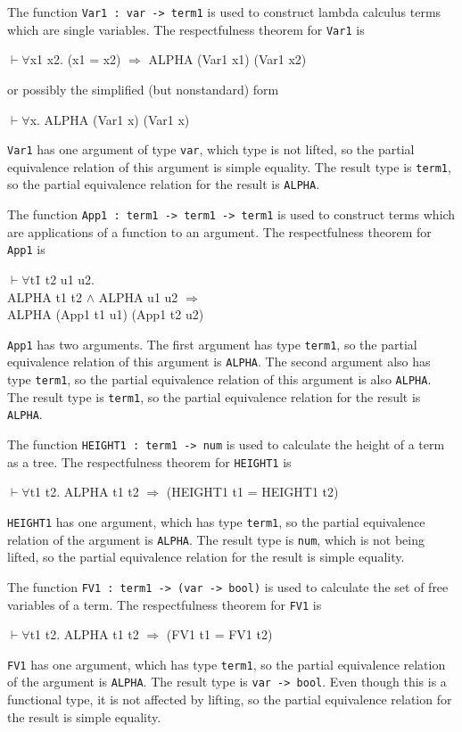 \documentclass[envcountsame,runningheads]{llncs}
\newcommand{\quotient}{partial equivalence}
\begin{document}
The function {\tt Var1 : var -> term1} is used to construct
lambda calculus terms which are single variables.
The respectfulness theorem for {\tt Var1} is
{\tt \begin{tabbing}
\hspace{5.5mm}
    $\vdash \forall$x1 x2. (x1 = x2) $\Rightarrow$ ALPHA (Var1 x1) (Var1 x2)
\end{tabbing}}
\pagebreak[2]
\noindent
or possibly the simplified (but nonstandard) form
{\tt \begin{tabbing}
\hspace{5.5mm}
    $\vdash \forall$x. ALPHA (Var1 x) (Var1 x)
\end{tabbing}}
{\tt Var1} has one argument of type {\tt var}, which type is not lifted,
so the \quotient{} relation of this argument is simple equality.
The result type is {\tt term1}, so the \quotient{} relation for the
result is {\tt ALPHA}.

The function {\tt App1 : term1 -> term1 -> term1}
is used to construct terms which are applications of a function to an argument.
The respectfulness theorem for {\tt App1} is
{\tt \begin{tabbing}
\hspace{5.5mm}
    $\vdash \forall$t\=1 t2 u1 u2. \\
\>       ALPHA t1 t2 $\wedge$ ALPHA u1 u2 $\Rightarrow$\\
\>       ALPHA (App1 t1 u1) (App1 t2 u2)
\end{tabbing}}
{\tt App1} has two arguments.
The first argument has type {\tt term1},
so the \quotient{} relation of this argument is {\tt ALPHA}.
The second argument also has type {\tt term1},
so the \quotient{} relation of this argument is also {\tt ALPHA}.
The result type is {\tt term1}, so the \quotient{} relation for the
result is {\tt ALPHA}.

The function {\tt HEIGHT1 : term1 -> num}
is used to calculate the height of a term as a tree.
The respectfulness theorem for {\tt HEIGHT1} is
{\tt \begin{tabbing}
\hspace{5.5mm}
    $\vdash \forall$t1 t2. ALPHA t1 t2 $\Rightarrow$ (HEIGHT1 t1 = HEIGHT1 t2)
\end{tabbing}}
{\tt HEIGHT1} has one argument, which
has type {\tt term1},
so the \quotient{} relation of the argument is {\tt ALPHA}.
The result type is {\tt num}, which is not being lifted,
so the \quotient{} relation for the result is simple equality.

The function {\tt FV1 : term1 -> (var -> bool)}
is used to calculate the set of free variables of a term.
The respectfulness theorem for {\tt FV1} is
{\tt \begin{tabbing}
\hspace{5.5mm}
    $\vdash \forall$t1 t2. ALPHA t1 t2 $\Rightarrow$ (FV1 t1 = FV1 t2)
\end{tabbing}}
{\tt FV1} has one argument, which
has type {\tt term1},
so the \quotient{} relation of the argument is {\tt ALPHA}.
The result type is {\tt var -> bool}.
Even though this is a functional type,
it is not affected by lifting,
so the \quotient{} relation for the result is simple equality.
\end{document}
